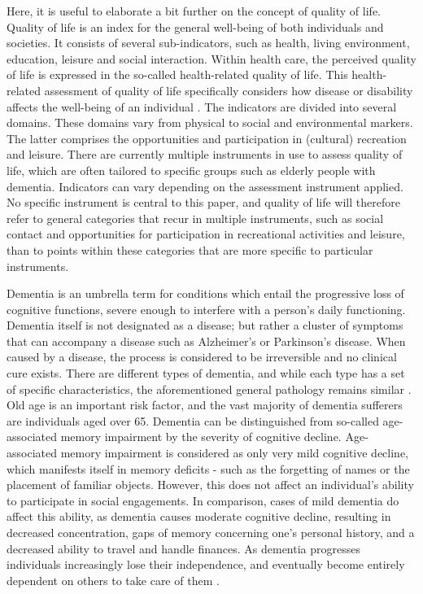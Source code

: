 	Here, it is useful to elaborate a bit further on the concept of quality of life. Quality of life is an index for the general well-being of both individuals and societies. It consists of several sub-indicators, such as health, living environment, education, leisure and social interaction. Within health care, the perceived quality of life is expressed in the so-called health-related quality of life. This health-related assessment of quality of life specifically considers how disease or disability affects the well-being of an individual \parencite{prevention_2011}.  
	The indicators are divided into several domains. These domains vary from physical to social and environmental markers. The latter comprises the opportunities and participation in (cultural) recreation and leisure. There are currently multiple instruments in use to assess quality of life, which are often tailored to specific groups such as elderly people with dementia. Indicators can vary depending on the assessment instrument applied. No specific instrument is central to this paper, and quality of life will therefore refer to general categories that recur in multiple instruments, such as social contact and opportunities for participation in recreational activities and leisure, than to points within these categories that are more specific to particular instruments.
		
	
	Dementia is an umbrella term for conditions which entail the progressive loss of cognitive functions, severe enough to interfere with a person’s daily functioning. Dementia itself is not designated as a disease; but rather a cluster of symptoms that can accompany a disease such as Alzheimer’s or Parkinson’s disease. When caused by a disease, the process is considered to be irreversible and no clinical cure exists.  There are different types of dementia, and while each type has a set of specific characteristics, the aforementioned general pathology remains similar \parencite{Europe_2013}. Old age is an important risk factor, and the vast majority of dementia sufferers are individuals aged over 65. Dementia can be distinguished from so-called age-associated memory impairment by the severity of cognitive decline. Age-associated memory impairment is considered as only very mild cognitive decline, which manifests itself in memory deficits - such as the forgetting of names or the placement of familiar objects. However, this does not affect an individual’s ability to participate in social engagements.  In comparison, cases of mild dementia do affect this ability, as dementia causes moderate cognitive decline, resulting in decreased concentration, gaps of memory concerning one’s personal history, and a decreased ability to travel and handle finances. As dementia progresses individuals increasingly lose their independence, and eventually become entirely dependent on others to take care of them \parencite{Reisberg_1983}.
	
